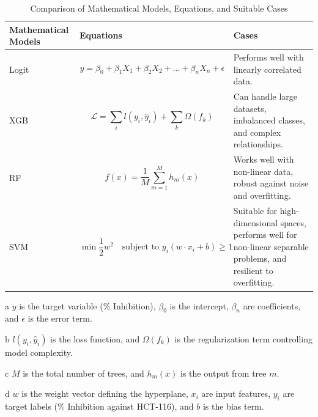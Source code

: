 \begin{table}[h]
	\centering
	\renewcommand{\arraystretch}{1.3}
	\small
	\begin{threeparttable} %
		\begin{tabular}{>{\centering\arraybackslash}p{2cm} >{\centering\arraybackslash}p{6cm} >{\centering\arraybackslash}p{6cm}}
			\hline
			\textbf{Mathematical Models} \cite{SML-formulas} & \textbf{Equations} & \textbf{Cases} \\
			\hline
			Logit \tnote{a} &  
			\begin{equation}
				y = \beta_0 + \beta_1X_1 + \beta_2X_2 + \ldots + \beta_nX_n + \epsilon
				\label{eq:logit}
			\end{equation} &  
			Performs well with linearly correlated data. \\  
			
			XGB \tnote{b} &  
			\begin{equation}
				\mathcal{L} = \sum_i l(y_i, \hat{y}_i) + \sum_k \Omega(f_k)
				\label{eq:xgboost}
			\end{equation} &  
			Can handle large datasets, imbalanced classes, and complex relationships. \\  
			
			RF \tnote{c} &  
			\begin{equation}
				f(x) = \frac{1}{M} \sum_{m=1}^M h_m(x)
				\label{eq:random}
			\end{equation} &  
			Works well with non-linear data, robust against noise and overfitting. \\  
			
			SVM \tnote{d} &  
			\begin{equation}  
				\min \frac{1}{2} w^2 \quad \text{subject to } y_i(w \cdot x_i + b) \geq 1
				\label{eq:svm}
			\end{equation} &  
			Suitable for high-dimensional spaces, performs well for non-linear separable problems, and resilient to overfitting. \\  
			\hline
		\end{tabular}
		\begin{tablenotes}
			\scriptsize
			\item[a] $ y $ is the target variable (\% Inhibition), $\beta_0$ is the intercept, $\beta_n$ are coefficients, and $\epsilon$ is the error term.
			\item[b] $ l(y_i, \hat{y}_i) $ is the loss function, and $ \Omega(f_k) $ is the regularization term controlling model complexity.
			\item[c] $ M $ is the total number of trees, and $ h_m(x) $ is the output from tree $ m $.
			\item[d] $ w $ is the weight vector defining the hyperplane, $ x_{i} $ are input features, $ y_{i} $ are target labels (\% Inhibition against HCT-116), and $ b $ is the bias term.
		\end{tablenotes}
	\end{threeparttable}
	\caption{Comparison of Mathematical Models, Equations, and Suitable Cases}
	\label{tab:math_models}
\end{table}

